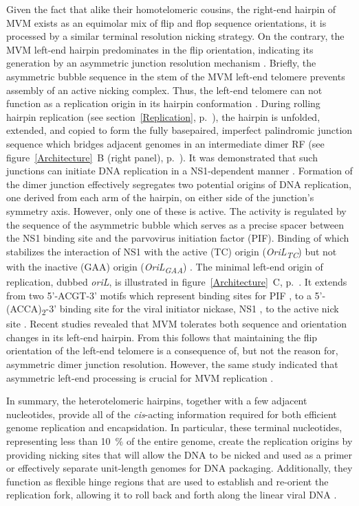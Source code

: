 Given the fact that alike their homotelomeric cousins, the right-end hairpin of MVM exists as an equimolar mix of flip and flop sequence orientations, it is processed by a similar terminal resolution nicking strategy. On the contrary, the MVM left-end hairpin predominates in the flip orientation, indicating its generation by an asymmetric junction resolution mechanism \cite{pmid12743281}. Briefly, the asymmetric bubble sequence in the stem of the MVM left-end telomere prevents assembly of an active nicking complex. Thus, the left-end telomere can not function as a replication origin in its hairpin conformation \cite{pmid8995615}. During rolling hairpin replication (see section~\ref{Replication}, p.~\pageref{Replication}), the hairpin is unfolded, extended, and copied to form the fully basepaired, imperfect palindromic junction sequence which bridges adjacent genomes in an intermediate dimer RF (see figure~\ref{Architecture}~B (right panel), p.~\pageref{Architecture}). It was demonstrated that such junctions can initiate DNA replication in a NS1-dependent manner \cite{pmid8076610, pmid1530771}. Formation of the dimer junction effectively segregates two potential origins of DNA replication, one derived from each arm of the hairpin, on either side of the junction's symmetry axis. However, only one of these is active. The activity is regulated by the sequence of the asymmetric bubble which serves as a precise spacer between the NS1 binding site and the parvovirus initiation factor (PIF). Binding of which stabilizes the interaction of NS1 with the active (TC) origin (\textit{OriL\textsubscript{TC}}) but not with the inactive (GAA) origin (\textit{OriL\textsubscript{GAA}}) \cite{pmid11435581}. The minimal left-end origin of replication, dubbed \textit{oriL}, is illustrated in figure~\ref{Architecture}~C, p.~\pageref{Architecture}. It extends from two 5'-ACGT-3' motifs which represent binding sites for PIF \cite{pmid8995666, pmid9223459, pmid10523663}, to a 5'-(ACCA)\textsubscript{2}-3' binding site for the viral initiator nickase, NS1 \cite{pmid7853501}, to the active nick site \cite{pmid8076610}. Recent studies revealed that MVM tolerates both sequence and orientation changes in its left-end hairpin. From this follows that maintaining the flip orientation of the left-end telomere is a consequence of, but not the reason for, asymmetric dimer junction resolution. However, the same study indicated that asymmetric left-end processing is crucial for MVM replication \cite{pmid22933276}.  

In summary, the heterotelomeric hairpins, together with a few adjacent nucleotides, provide all of the \textit{cis}-acting information required for both efficient genome replication and encapsidation. In particular, these terminal nucleotides, representing less than 10~\% of the entire genome, create the replication origins by providing nicking sites that will allow the DNA to be nicked and used as a primer or effectively separate unit-length genomes for DNA packaging. Additionally, they function as flexible hinge regions that are used to establish and re-orient the replication fork, allowing it to roll back and forth along the linear viral DNA \cite{telomere2, telomere3, handbook, RHR}.        

